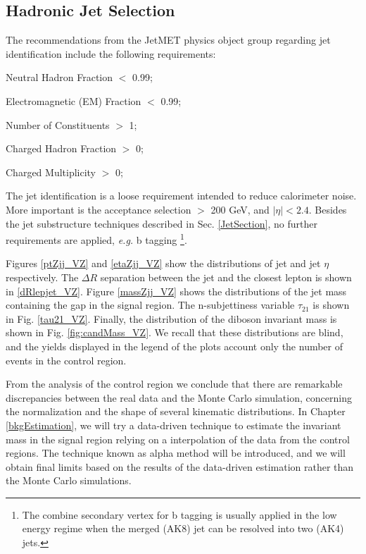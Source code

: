 \subsection{Hadronic Jet Selection}
The recommendations from the JetMET physics object group \cite{jetmetPOG} regarding jet identification include the following requirements:
\begin{compact_itemize}
\item Neutral Hadron Fraction $<$ 0.99;
\item Electromagnetic (EM) Fraction $<$ 0.99;
\item Number of Constituents $>$ 1;
\item Charged Hadron Fraction $>$ 0;
\item Charged Multiplicity $>$ 0;
\end{compact_itemize}
The jet identification is a loose requirement intended to reduce calorimeter noise. More important is the acceptance selection \ptrans $>$ 200 GeV, and $|\eta|<2.4$. Besides the jet substructure techniques described in Sec. \ref{JetSection}, no further requirements are applied, {\it e.g.} b tagging \footnote{The combine secondary vertex for b tagging is usually applied in the low energy regime when the merged (AK8) jet can be resolved into two (AK4) jets.}.

Figures \ref{ptZjj_VZ} and \ref{etaZjj_VZ} show the distributions of jet \ptrans and jet $\eta$ respectively. The $\Delta R$ separation between the jet and the closest lepton is shown in \ref{dRlepjet_VZ}. Figure \ref{massZjj_VZ} shows the distributions of the jet mass containing the gap in the signal region. The n-subjettiness variable $\tau_{21}$ is shown in Fig. \ref{tau21_VZ}. Finally, the distribution of the diboson invariant mass is shown in Fig. \ref{fig:candMass_VZ}. We recall that these distributions are blind, and the yields displayed in the legend of the plots account only the number of events in the control region.

From the analysis of the control region we conclude that there are remarkable discrepancies between the real data and the Monte Carlo simulation, concerning the normalization and the shape of several kinematic distributions. In Chapter \ref{bkgEstimation}, we will try a data-driven technique to estimate the invariant mass in the signal region relying on a interpolation of the data from the control regions. The technique known as alpha method \cite{Mozer:2016wzi} will be introduced, and we will obtain final limits based on the results of the data-driven estimation rather than the Monte Carlo simulations.

